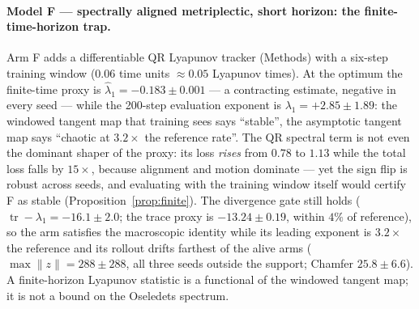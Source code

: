 \documentclass[journal]{IEEEtran}
\newcommand{\tr}{\operatorname{tr}}
\begin{document}
\paragraph{Model F --- spectrally aligned metriplectic, short horizon:
the finite-time-horizon trap.}
Arm F adds a differentiable QR Lyapunov tracker (Methods) with a
six-step training window ($0.06$ time units $\approx0.05$ Lyapunov
times). At the optimum the finite-time proxy is $\hat\lambda_1=
-0.183\pm0.001$ --- a contracting estimate, negative in every seed ---
while the 200-step evaluation exponent is $\lambda_1=+2.85\pm1.89$:
the windowed tangent map that training sees says ``stable'', the
asymptotic tangent map says ``chaotic at $3.2\times$ the reference
rate''. The QR spectral term is not even the dominant shaper of the
proxy: its loss \emph{rises} from $0.78$ to $1.13$ while the total
loss falls by $15\times$, because alignment and motion dominate --- yet
the sign flip is robust across seeds, and evaluating with the training
window itself would certify F as stable (Proposition~\ref{prop:finite}).
The divergence gate still holds ($\tr-\lambda_1=-16.1\pm2.0$; the
trace proxy is $-13.24\pm0.19$, within $4\%$ of reference), so the arm
satisfies the macroscopic identity while its leading exponent is
$3.2\times$ the reference and its rollout drifts farthest of the alive
arms ($\max\|z\|=288\pm288$, all three seeds outside the support;
Chamfer $25.8\pm6.6$). A finite-horizon Lyapunov statistic is a
functional of the windowed tangent map; it is not a bound on the
Oseledets spectrum.
\end{document}
